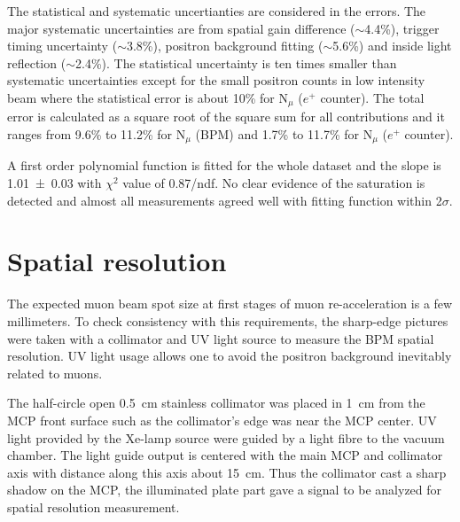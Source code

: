 \documentclass[preprint,3p,twocolumn]{elsarticle}
\begin{document}
The statistical and systematic uncertianties are considered in the errors. The major systematic uncertainties are from spatial gain difference ($\sim$4.4\%), trigger timing uncertainty ($\sim$3.8\%), positron background fitting ($\sim$5.6\%) and inside light reflection ($\sim$2.4\%). The statistical uncertainty is ten times smaller than systematic uncertainties except for the small positron counts in low intensity beam where the statistical error is about 10\% for N$_\mu$ ($e^+$ counter). The total error is calculated as a square root of the square sum for all contributions and it ranges from 9.6\% to 11.2\% for N$_\mu$ (BPM) and 1.7\% to 11.7\% for N$_\mu$ ($e^+$ counter).

A first order polynomial function is fitted for the whole dataset and the slope is \num{1.01\pm 0.03} with $\chi^{2}$ value of 0.87/ndf. No clear evidence of the saturation is detected and almost all measurements agreed well with fitting function within 2$\sigma$.  

\section{Spatial resolution}
 
The expected muon beam spot size at first stages of muon re-acceleration is a few millimeters.
To check consistency with this requirements, the sharp-edge pictures were taken with a collimator and UV light source to measure the BPM spatial resolution.
UV light usage allows one to avoid the positron background inevitably related to muons.

The half-circle open \SI{.5}{\cm} stainless collimator was placed in \SI{1}{\cm} from the MCP front surface
such as the collimator's edge was near the MCP center.
UV light provided by the Xe-lamp source were guided by a light fibre to the vacuum chamber.
The light guide output is centered with the main MCP and collimator axis
with distance along this axis about \SI{15}{\cm}.
Thus the collimator cast a sharp shadow on the MCP,
the illuminated plate part gave a signal to be analyzed for spatial resolution measurement.
\end{document}
